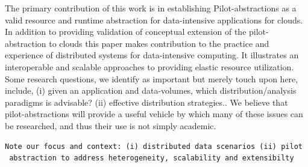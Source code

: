 \documentclass[times]{cpeauth}
\newcommand{\pilot}{Pilot\xspace}
\begin{document}


The primary contribution of this work is in establishing
\pilot-abstractions as a valid resource and runtime abstraction for
data-intensive applications for clouds.  In addition to providing
validation of conceptual extension of the pilot-abstraction to clouds
this paper makes contribution to the practice and experience of
distributed systems for data-intensive computing. It illustrates an
interoperable and scalable approaches to providing elastic resource
utilization. Some research questions, we identify as important but
merely touch upon here, include, (i) given an application and
data-volumes, which distribution/analysis paradigms is advisable?
(ii) effective distribution strategies.. We believe that
pilot-abstractions will provide a useful vehicle by which many of
these issues can be researched, and thus their use is not simply
academic.




\begin{verbatim}
Note our focus and context: (i) distributed data scenarios (ii) pilot
 abstraction to address heterogeneity, scalability and extensibilty
\end{verbatim}
\end{document}
